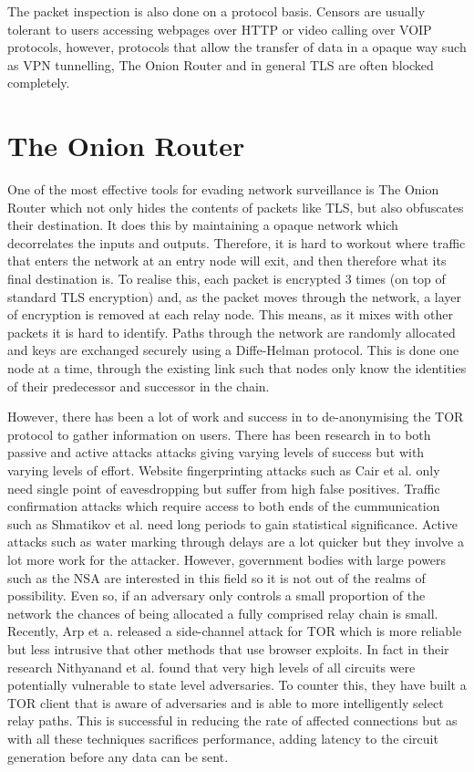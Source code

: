 \documentclass[10pt,a4paper]{article}
\begin{document}
The packet inspection is also done on a protocol basis. Censors are usually tolerant to users accessing webpages over HTTP or video calling over VOIP protocols, however, protocols that allow the transfer of data in a opaque way such as VPN tunnelling, The Onion Router and in general TLS are often blocked completely.

\section{The Onion Router}

One of the most effective tools for evading network surveillance is The Onion Router which not only hides the contents of packets like TLS, but also obfuscates their destination. It does this by maintaining a opaque network which decorrelates the inputs and outputs. Therefore, it is hard to workout where traffic that enters the network at an entry node will exit, and then therefore what its final destination is. To realise this, each packet is encrypted 3 times (on top of standard TLS encryption) and, as the packet moves through the network, a layer of encryption is removed at each relay node. This means, as it mixes with other packets it is hard to identify. Paths through the network are randomly allocated and keys are exchanged securely using a Diffe-Helman protocol. This is done one node at a time, through the existing link such that nodes only know the identities of their predecessor and successor in the chain. 

However, there has been a lot of work and success in to de-anonymising the TOR protocol to gather information on users. There has been research in to both passive and active attacks attacks giving varying levels of success but with varying levels of effort.  Website fingerprinting attacks such as Cair et al.\cite{webfinger} only need single point of eavesdropping but suffer from high false positives. Traffic confirmation attacks which require access to both ends of the cummunication such as Shmatikov et al.\cite{conf} need long periods to gain statistical significance. Active attacks such as water marking through delays are a lot quicker but they involve a lot more work for the attacker. However, government bodies with large powers such as the NSA are interested in this field so it is not out of the realms of possibility. Even so, if an adversary only controls a small proportion of the network the chances of being allocated a fully comprised relay chain is small. Recently, Arp et a.\cite{torben} released a side-channel attack for TOR which is more reliable but less intrusive that other methods that use browser exploits. In fact in their research Nithyanand et al.\cite{AS} found that very high levels of all circuits were potentially vulnerable to state level adversaries. To counter this, they have built a TOR client that is aware of adversaries and is able to more intelligently select relay paths. This is successful in reducing the rate of affected connections but as with all these techniques sacrifices performance, adding latency to the circuit generation before any data can be sent.
\end{document}
